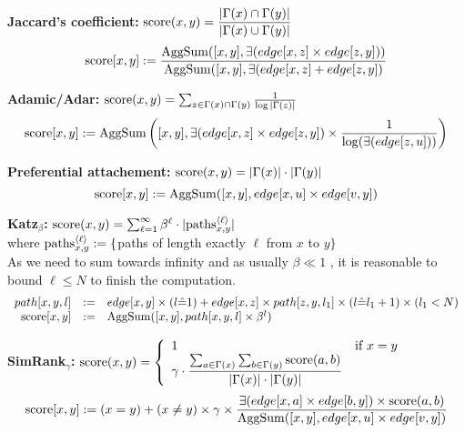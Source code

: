 \documentclass[11pt]{article}
\begin{document}
{\bf Jaccard's coefficient:} ${\rm score}(x,y)=\dfrac{|\Gamma(x) \cap \Gamma(y)|}{|\Gamma(x) \cup \Gamma(y)|}$
\[{\rm score}[x,y] := \dfrac{{\rm AggSum}([x,y], \exists(edge[x,z] \times edge[z,y]))}
					{{\rm AggSum}([x,y], \exists(edge[x,z] + edge[z,y])}\]

{\bf Adamic/Adar:} ${\rm score}(x,y)=\sum_{z\in \Gamma(x) \cap \Gamma(y)}\frac{1}{\log|\Gamma(z)|}$
\[{\rm score}[x,y] := {\rm AggSum}\left([x,y], \exists(edge[x,z]\times edge[z,y])  \times \dfrac{1}{\log(\exists(edge[z,u]))}\right)\]

{\bf Preferential attachement:} ${\rm score}(x,y)=|\Gamma(x)| \cdot |\Gamma(y)|$
\[{\rm score}[x,y] := {\rm AggSum}([x,y], edge[x,u] \times edge[v,y])\]

{\bf Katz${}_{\beta}$:} ${\rm score}(x,y)=\sum_{\ell=1}^{\infty} \beta^\ell \cdot |{\rm paths}_{x,y}^{\langle\ell\rangle}|$ \\where ${\rm paths}_{x,y}^{\langle\ell\rangle} := \{$paths of length exactly $\ell$ from $x$ to $y\}$\\
As we need to sum towards infinity and as usually $\beta \ll 1$ \cite{linkpred}, it is reasonable to bound $\ell \le N$ to finish the computation.
\[\begin{array}{rcl}
path[x,y,l] &:=& edge[x,y] \times (l\hat=1) +  edge[x,z] \times path[z,y,l_1] \times (l\hat= l_1+1) \times (l_1<N)\\
{\rm score}[x,y] &:=& {\rm AggSum}([x,y], path[x,y,l] \times \beta^l )
\end{array}\]

{\bf SimRank${}_\gamma$:} ${\rm score}(x,y)=\left\{\begin{array}{ll}1&\text{if }x=y\\
	\gamma\cdot\dfrac{\sum_{a\in\Gamma(x)}\sum_{b\in\Gamma(y)} {\rm score}(a,b)}
		{|\Gamma(x)| \cdot |\Gamma(y)|} \end{array}\right.$
\[{\rm score}[x,y] := (x=y) + (x\ne y) \times\gamma\times\dfrac
	{\exists(edge[x,a] \times edge[b,y]) \times {\rm score}(a,b)}
	{{\rm AggSum}([x,y], edge[x,u] \times edge[v,y])}\]

\end{document}

